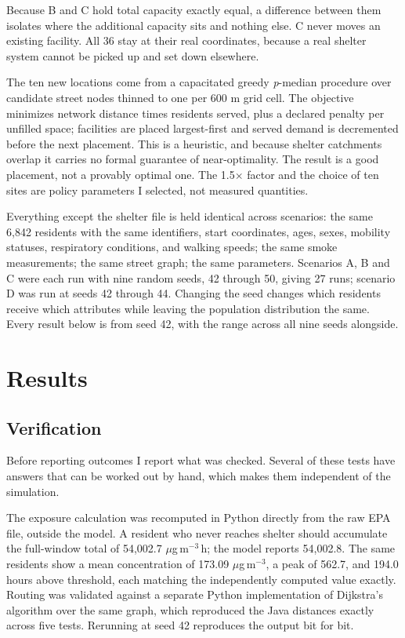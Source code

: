 \documentclass[graybox]{svmult}
\begin{document}
Because B and C hold total capacity exactly equal, a difference between them
isolates where the additional capacity sits and nothing else. C never moves an
existing facility. All 36 stay at their real coordinates, because a real shelter
system cannot be picked up and set down elsewhere.

The ten new locations come from a capacitated greedy \emph{p}-median procedure
over candidate street nodes thinned to one per 600 m grid cell. The objective
minimizes network distance times residents served, plus a declared penalty per
unfilled space; facilities are placed largest-first and served demand is
decremented before the next placement. This is a heuristic, and because shelter
catchments overlap it carries no formal guarantee of near-optimality. The result
is a good placement, not a provably optimal one. The 1.5$\times$ factor and the
choice of ten sites are policy parameters I selected, not measured quantities.

Everything except the shelter file is held identical across scenarios: the same
6,842 residents with the same identifiers, start coordinates, ages, sexes,
mobility statuses, respiratory conditions, and walking speeds; the same smoke
measurements; the same street graph; the same parameters. Scenarios A, B and C
were each run with nine random seeds, 42 through 50, giving 27 runs; scenario D
was run at seeds 42 through 44. Changing the seed changes
which residents receive which attributes while leaving the population
distribution the same. Every result below is from seed 42, with the range across
all nine seeds alongside.

\section{Results}
\label{sec:results}

\subsection{Verification}
\label{sec:verification}

Before reporting outcomes I report what was checked. Several of these tests have
answers that can be worked out by hand, which makes them independent of the
simulation.

The exposure calculation was recomputed in Python directly from the raw EPA file,
outside the model. A resident who never reaches shelter should accumulate the
full-window total of 54,002.7 $\mu$g\,m$^{-3}$\,h; the model reports 54,002.8.
The same residents show a mean concentration of 173.09 $\mu$g\,m$^{-3}$, a peak
of 562.7, and 194.0 hours above threshold, each matching the independently
computed value exactly. Routing was validated against a separate Python
implementation of Dijkstra's algorithm over the same graph, which reproduced the
Java distances exactly across five tests. Rerunning at seed 42 reproduces the
output bit for bit.
\end{document}
